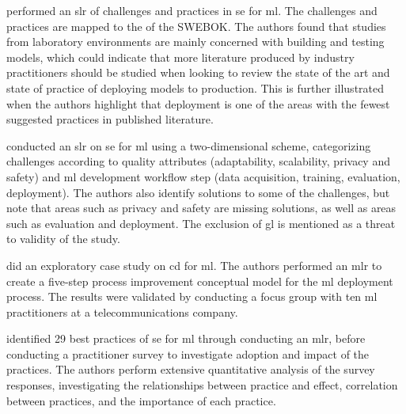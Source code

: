 \textcite{Nascimento2020} performed an \acrshort{slr} of challenges and practices in \acrshort{se} for \acrshort{ml}. The challenges and practices are mapped to the  of the SWEBOK.
The authors found that studies from laboratory environments are mainly concerned with building and testing models, which could indicate that more literature produced by industry practitioners should be studied when looking to review the state of the art and state of practice of deploying models to production.
This is further illustrated when the authors highlight that deployment is one of the areas with the fewest suggested practices in published literature.

\textcite{Lwakatare2020} conducted an \acrshort{slr} on  \acrshort{se} for \acrshort{ml} using a two-dimensional scheme, categorizing challenges according to quality attributes (adaptability, scalability, privacy and safety) and \acrshort{ml} development workflow step (data acquisition, training, evaluation, deployment).
The authors also identify solutions to some of the challenges, but note that areas such as privacy and safety are missing solutions, as well as areas such as evaluation and deployment.
The exclusion of \acrshort{gl} is mentioned as a threat to validity of the study.

\textcite{Lwakatare2020a} did an exploratory case study on \acrshort{cd} for \acrshort{ml}.
The authors performed an \acrshort{mlr} to create a five-step process improvement conceptual model for the \acrshort{ml} deployment process. 
The results were validated by conducting a focus group with ten \acrshort{ml} practitioners at a telecommunications company.

\textcite{Serban2020} identified 29 best practices of \acrshort{se} for \acrshort{ml} through conducting an \acrshort{mlr}, before conducting a practitioner survey to investigate adoption and impact of the practices.
The authors perform extensive quantitative analysis of the survey responses, investigating the relationships between practice and effect, correlation between practices, and the importance of each practice.


